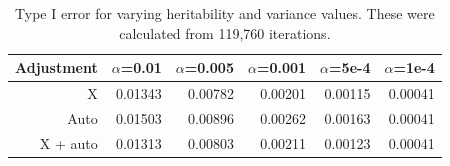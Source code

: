 \documentclass[11pt]{article} %
\begin{document}
\bgroup
\def\arraystretch{1.0}
\begin{table}[ht]
\centering
\begin{tabular}{rrrrrr}
  \hline
 Adjustment& $\alpha$=0.01 & $\alpha$=0.005 & $\alpha$=0.001 & $\alpha$=5e-4 & $\alpha$=1e-4 \\ 
  \hline
X  & 0.01343 & 0.00782 & 0.00201 & 0.00115 & 0.00041 \\ 
 Auto  & 0.01503 & 0.00896 & 0.00262 & 0.00163 & 0.00041 \\ 
 X + auto  & 0.01313 & 0.00803 & 0.00211 & 0.00123 & 0.00041 \\ 
   \hline
\end{tabular}
\caption{Type I error for varying heritability and variance values. These were calculated from 119,760 iterations.}
\label{typeIvars}
\end{table}
\end{document}
